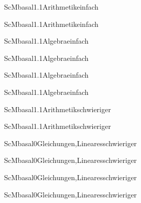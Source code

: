 \documentclass[12pt]{article}
\begin{document}
\begin{Add}{ScM}{basal1.1}{Arithmetik}{einfach}
\solution{ }
\end{Add}
\begin{Add}{ScM}{basal1.1}{Arithmetik}{einfach}
\end{Add}

\begin{Add}{ScM}{basal1.1}{Algebra}{einfach}
\solution{ }
\end{Add}
\begin{Add}{ScM}{basal1.1}{Algebra}{einfach}
\end{Add}

\begin{Add}{ScM}{basal1.1}{Algebra}{einfach}
\solution{ }
\end{Add}
\begin{Add}{ScM}{basal1.1}{Algebra}{einfach}
\end{Add}

\begin{Add}{ScM}{basal1.1}{Arithmetik}{schwieriger}
\solution{ }
\end{Add}
\begin{Add}{ScM}{basal1.1}{Arithmetik}{schwieriger}
\end{Add}

\begin{Add}{ScM}{basal0}{Gleichungen,Lineares}{schwieriger}
\solution{ }
\end{Add}
\begin{Add}{ScM}{basal0}{Gleichungen,Lineares}{schwieriger}
\end{Add}

\begin{Add}{ScM}{basal0}{Gleichungen,Lineares}{schwieriger}
\solution{ }
\end{Add}
\begin{Add}{ScM}{basal0}{Gleichungen,Lineares}{schwieriger}
\end{Add}
\end{document}
